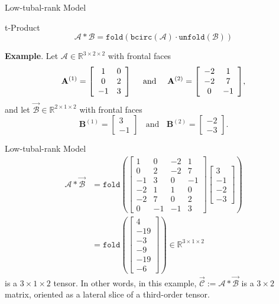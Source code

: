\documentclass[t, 10pt, handout, aspectratio=169]{beamer}
\begin{document}
\begin{frame}{Low-tubal-rank Model}
\begin{block}{t-Product}
$$\mathcal{A}*\mathcal{B}=\texttt{fold}(\texttt{bcirc}(\mathcal{A})\cdot\texttt{unfold}(\mathcal{B}))$$
\end{block}
\textbf{Example}. Let $\mathcal{A}\in\mathbb{R}^{3\times 2 \times 2}$ with frontal faces
$$
\mathbf{A}^{(1)}=\left[
\begin{array}{c c}
  1 & 0 \\
  0 & 2 \\
  -1 & 3
\end{array}
\right]~~~~
\text{and}~~~~\mathbf{A}^{(2)}=\mleft[
\begin{array}{c c}
  -2 & 1 \\
  -2 & 7 \\
  0 & -1
\end{array}
\mright],
$$
and let $\vec{\mathcal{B}}\in\mathbb{R}^{2\times 1 \times 2}$ with frontal faces
$$
\mathbf{B}^{(1)}=
\left[\begin{matrix}
3\\
-1
\end{matrix}\right]
~~~~\text{and}~~~~
\mathbf{B}^{(2)}=
\left[\begin{matrix}
-2\\
-3
\end{matrix}\right].
$$
\end{frame}

\begin{frame}{Low-tubal-rank Model}
$$
\begin{aligned}
\mathcal{A}*\vec{\mathcal{B}} & =\texttt{fold}\left(
\left[\begin{array}{cc|cc}
1 & 0 & -2 & 1\\
0 & 2 & -2 & 7\\
-1 & 3 & 0 & -1\\
\hline
-2 & 1 & 1 & 0\\
-2 & 7 & 0 & 2\\
0 & -1 & -1 & 3
\end{array}\right]
\left[\begin{array}{c}
3\\
-1\\
\hline
-2\\
-3
\end{array}\right]
\right)\\
& = \texttt{fold}\left(
\left[\begin{array}{c}
4\\
-19\\
-3\\
\hline
-9\\
-19\\
-6
\end{array}\right]
\right)\in\mathbb{R}^{3\times 1 \times 2}
\end{aligned}
$$
is a $3 \times 1 \times 2$ tensor. In other words, in this example, $\vec{\mathcal{C}} := \mathcal{A} * \vec{\mathcal{B}}$ is a $3\times 2$ matrix, oriented as a lateral slice of a third-order tensor.
\end{frame}
\end{document}
